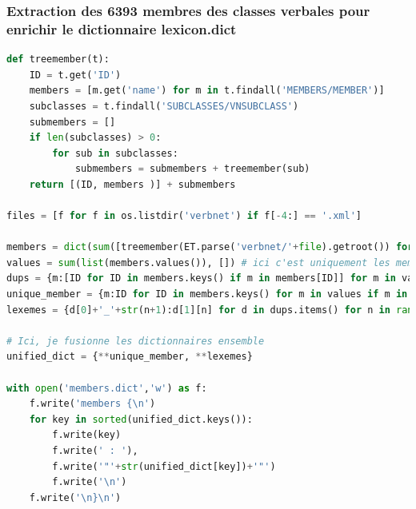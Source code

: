 

\subsubsection{Extraction des 6393 membres des classes verbales pour enrichir le dictionnaire lexicon.dict}

\begin{lstlisting}[language=Python, caption = code pour ajouter des lexèmes à lexicon.dict]
def treemember(t):
    ID = t.get('ID')
    members = [m.get('name') for m in t.findall('MEMBERS/MEMBER')]
    subclasses = t.findall('SUBCLASSES/VNSUBCLASS')
    submembers = []
    if len(subclasses) > 0:
        for sub in subclasses:
            submembers = submembers + treemember(sub)
    return [(ID, members )] + submembers

files = [f for f in os.listdir('verbnet') if f[-4:] == '.xml']

members = dict(sum([treemember(ET.parse('verbnet/'+file).getroot()) for file in files], [])) # ici on a classe : [membre,...]
values = sum(list(members.values()), []) # ici c'est uniquement les membres, sans infos sur leur classe
dups = {m:[ID for ID in members.keys() if m in members[ID]] for m in values if values.count(m)>1}
unique_member = {m:ID for ID in members.keys() for m in values if m in members[ID] and values.count(m)==1}
lexemes = {d[0]+'_'+str(n+1):d[1][n] for d in dups.items() for n in range(len(d[1]))}

# Ici, je fusionne les dictionnaires ensemble
unified_dict = {**unique_member, **lexemes}

with open('members.dict','w') as f:
    f.write('members {\n')
    for key in sorted(unified_dict.keys()):
        f.write(key)
        f.write(' : '),
        f.write('"'+str(unified_dict[key])+'"')
        f.write('\n')
    f.write('\n}\n')

\end{lstlisting}

